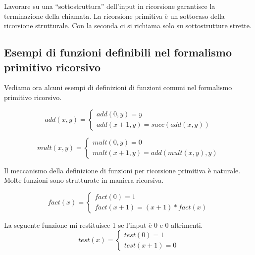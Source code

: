 Lavorare su una ``sottostruttura'' dell'input in ricorsione garantisce la terminazione della chiamata.
La ricorsione primitiva è un sottocaso della ricorsione strutturale. Con la seconda ci si richiama
solo su sottostrutture strette.

\subsection{Esempi di funzioni definibili nel formalismo primitivo ricorsivo}

Vediamo ora alcuni esempi di definizioni di funzioni comuni nel formalismo primitivo ricorsivo.

\begin{equation*}
    \textit{add}(x,y) = 
    \begin{cases}
        \textit{add}(0,y) = y \\
        \textit{add}(x+1,y) = \textit{succ}(\textit{add}(x,y))
    \end{cases}
\end{equation*}

\begin{equation*}
    \textit{mult}(x,y) = 
    \begin{cases}
        \textit{mult}(0,y) = 0 \\
        \textit{mult}(x+1,y) = \textit{add}(\textit{mult}(x,y),y)
    \end{cases}
\end{equation*}

Il meccanismo della definizione di funzioni per ricorsione primitiva è naturale. Molte funzioni
sono strutturate in maniera ricorsiva.

\begin{equation*}
    \textit{fact}(x) =
    \begin{cases}
        \textit{fact}(0) = 1 \\
        \textit{fact}(x+1) = (x+1)*\textit{fact}(x)
    \end{cases}
\end{equation*}


La seguente funzione mi restituisce 1 se l'input è 0 e 0 altrimenti.
\begin{equation*}
    \textit{test}(x) = 
    \begin{cases}
        \textit{test}(0) = 1 \\
        \textit{test}(x+1) = 0
    \end{cases}
\end{equation*}

